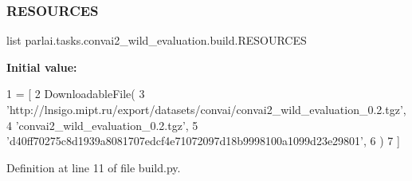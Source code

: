 \subsubsection{\texorpdfstring{R\+E\+S\+O\+U\+R\+C\+ES}{RESOURCES}}
{\footnotesize\ttfamily list parlai.\+tasks.\+convai2\+\_\+wild\+\_\+evaluation.\+build.\+R\+E\+S\+O\+U\+R\+C\+ES}

{\bfseries Initial value\+:}
\begin{DoxyCode}
1 =  [
2     DownloadableFile(
3         \textcolor{stringliteral}{'http://lnsigo.mipt.ru/export/datasets/convai/convai2\_wild\_evaluation\_0.2.tgz'},
4         \textcolor{stringliteral}{'convai2\_wild\_evaluation\_0.2.tgz'},
5         \textcolor{stringliteral}{'d40ff70275c8d1939a8081707edcf4e71072097d18b9998100a1099d23e29801'},
6     )
7 ]
\end{DoxyCode}


Definition at line 11 of file build.\+py.


